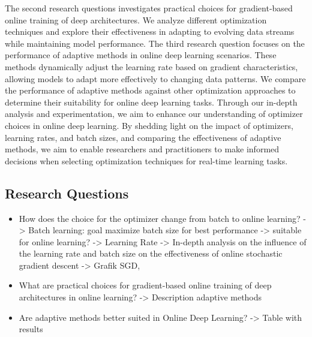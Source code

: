 \documentclass[letterpaper]{article} %
\begin{document}
The second research questions investigates practical choices for gradient-based online training of deep architectures.
We analyze different optimization techniques and explore their effectiveness in adapting to evolving data streams while maintaining model performance.
The third research question focuses on the performance of adaptive methods in online deep learning scenarios.
These methods dynamically adjust the learning rate based on gradient characteristics, allowing models to adapt more effectively to changing data patterns. We compare the performance of adaptive methods against other optimization approaches to determine their suitability for online deep learning tasks.
Through our in-depth analysis and experimentation, we aim to enhance our understanding of optimizer choices in online deep learning.
By shedding light on the impact of optimizers, learning rates, and batch sizes, and comparing the effectiveness of adaptive methods, we aim to enable researchers and practitioners to make informed decisions when selecting optimization techniques for real-time learning tasks.



\subsection{Research Questions}
\begin{itemize}

	\item How does the choice for the optimizer change from batch to online learning?
	      -> Batch learning: goal maximize batch size for best performance -> suitable for online learning?
	      -> Learning Rate
	      -> In-depth analysis on the influence of the learning rate and batch size on the effectiveness of online stochastic gradient descent
	      -> Grafik SGD,
	\item What are practical choices for gradient-based online training of deep architectures in online learning?
	      -> Description adaptive methods
	\item Are adaptive methods better suited in Online Deep Learning?
	      -> Table with results
\end{itemize}
\end{document}
